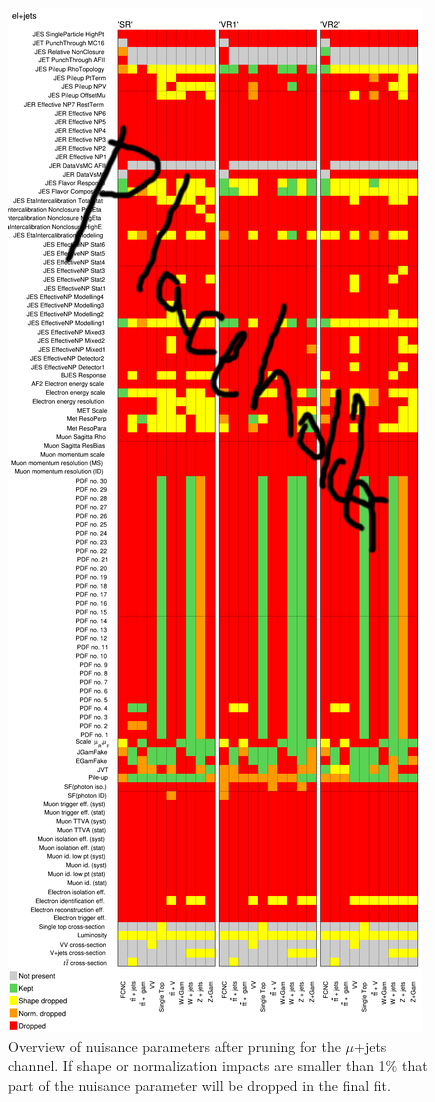 \begin{figure}[h!]
	\centering
	\includegraphics[width=.5\columnwidth]{../ThesisImages/RegionPlots/FinalRegions/FCNC_All_mujets/Pruning.png}
	\caption[Nuisance parameters after pruning for $\mu$+jets channel]{Overview of nuisance parameters after pruning for the $\mu$+jets channel.  If shape or normalization impacts are smaller than 1\% that part of the nuisance parameter will be dropped in the final fit. }
	\label{fig:Pruningmujets}
\end{figure}

